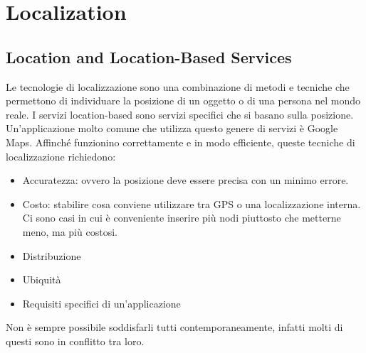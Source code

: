 
\newcommand{\tabitem}{~~\llap{\textbullet}~~}

% 
\chapter{Localization}\label{sec3}

\section{Location and Location-Based Services}\label{subsec3.1}

Le tecnologie di localizzazione sono una combinazione di metodi e
tecniche che permettono di individuare la posizione di un oggetto o di una
persona nel mondo reale. I servizi location-based sono servizi specifici che si
basano sulla posizione. Un'applicazione molto comune che utilizza questo genere
di servizi è Google Maps.
Affinché funzionino correttamente e in modo efficiente, queste tecniche
di localizzazione richiedono:
\begin{itemize}
   \item Accuratezza: ovvero la posizione deve essere precisa con
un minimo errore.
    \item Costo: stabilire cosa conviene utilizzare tra GPS o una
localizzazione interna. Ci sono casi in cui è conveniente inserire più nodi
piuttosto che metterne meno, ma più costosi.
    \item Distribuzione
    \item Ubiquità
    \item Requisiti specifici di un'applicazione
\end{itemize}
Non è sempre possibile soddisfarli tutti contemporaneamente, infatti
molti di questi sono in conflitto tra loro.

